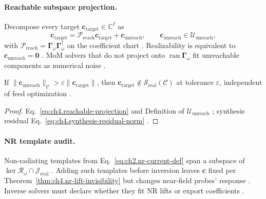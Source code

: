 
\paragraph{Reachable subspace projection.}
Decompose every target \(\mathbf{c}_{\mathrm{target}}\in\mathbb{C}^{I}\) as
\begin{equation}
\label{eq:ch4.reachable-projection}
\mathbf{c}_{\mathrm{target}}=\mathcal{P}_{\mathrm{reach}}\mathbf{c}_{\mathrm{target}}+\mathbf{c}_{\mathrm{unreach}},\qquad
\mathbf{c}_{\mathrm{unreach}}\in\mathcal{U}_{\mathrm{unreach}},
\end{equation}
with \(\mathcal{P}_{\mathrm{reach}}=\boldsymbol{\Gamma}_\omega\boldsymbol{\Gamma}_\omega^{\dagger}\) on the coefficient chart
\cite{harrington2001,stratton1941,devaney2004}. Realizability is equivalent to \(\mathbf{c}_{\mathrm{unreach}}=\mathbf{0}\)
\cite{hansen1988}. MoM solvers that do not project onto \(\operatorname{ran}\boldsymbol{\Gamma}_\omega\) fit unreachable components as
numerical noise \cite{harrington2001}.

\begin{theorem}
\label{thm:ch4.unreachable-obstruction}
If \(\|\mathbf{c}_{\mathrm{unreach}}\|_{\mathcal{C}}>\varepsilon\|\mathbf{c}_{\mathrm{target}}\|\), then
\(\mathbf{c}_{\mathrm{target}}\notin\mathcal{S}_{\mathrm{real}}(\mathcal{C})\) at tolerance \(\varepsilon\), independent of feed optimization
\cite{stratton1941,harrington2001,devaney2004,hansen1988}.
\end{theorem}
\begin{proof}
Eq.~\eqref{eq:ch4.reachable-projection} and Definition of \(\mathcal{U}_{\mathrm{unreach}}\) \cite{stratton1941}; synthesis residual
Eq.~\eqref{eq:ch4.synthesis-residual-norm} \cite{harrington2001}.
\end{proof}

\paragraph{NR template audit.}
Non-radiating templates from Eq.~\eqref{eq:ch2.nr-current-def} span a subspace of \(\ker\mathcal{R}_\omega\cap\mathcal{J}_{\mathrm{real}}\)
\cite{stratton1941,harrington2001}. Adding such templates before inversion leaves \(\mathbf{c}\) fixed per Theorem~\ref{thm:ch4.nr-lift-invisibility}
but changes near-field probes' response \cite{devaney2004,hansen1988}. Inverse solvers must declare whether they fit NR lifts or export coefficients
\cite{harrington2001}.

